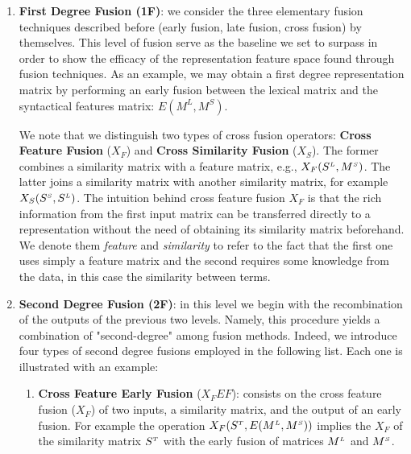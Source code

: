  \begin{enumerate}
\item \textbf{First Degree Fusion (1F)}: we  consider the  three elementary fusion techniques described before (early fusion, late fusion, cross fusion) by themselves.  This level of fusion serve as the baseline we set to surpass in order to show the efficacy of the representation feature space found through fusion techniques.
As an example, we may obtain a first degree representation matrix by performing an early fusion between the lexical matrix and the syntactical features matrix: $E(M^{L}, M^{S})$. 

We note that we distinguish two types of cross fusion operators: \textbf{Cross Feature Fusion} ($X_F$) and \textbf{Cross Similarity Fusion} ($X_S$). The former combines a similarity matrix with a feature matrix, e.g., $X_F(S^{\scriptscriptstyle L}, M^{\scriptscriptstyle S})$. The latter joins a similarity matrix with another similarity matrix, for example $X_S(S^{\scriptscriptstyle S}, S^{\scriptscriptstyle L})$. %
The intuition behind cross feature fusion $X_F$ is that the rich information from the first input matrix can be transferred directly to a representation without the need of obtaining its similarity matrix beforehand. We denote them \textit{feature} and \textit{similarity} to refer to the fact that the first one uses simply a feature matrix and the second requires some knowledge from the data, in this case the similarity between terms.

\item \textbf{Second Degree Fusion (2F)}: in this level we  begin with the recombination of the outputs of the previous two levels. Namely, this procedure  yields a combination of "second-degree" among fusion methods. Indeed, we introduce four types of second degree fusions employed in the following list. Each one is illustrated with an example:


\begin{enumerate}

\item \textbf{Cross Feature Early Fusion} ($X_FEF$): consists on the cross feature fusion ($X_F$) of two inputs, a similarity matrix, and the output of an early fusion. For example the operation $X_F(S^{\scriptscriptstyle T}, E(M^{\scriptscriptstyle L}, M^{\scriptscriptstyle S}))$ implies the $X_F$ of the similarity matrix $S^{\scriptscriptstyle T}$ with the early fusion of matrices $M^{\scriptscriptstyle L}$ and $M^{\scriptscriptstyle S}$.


\end{enumerate}
\end{enumerate}
